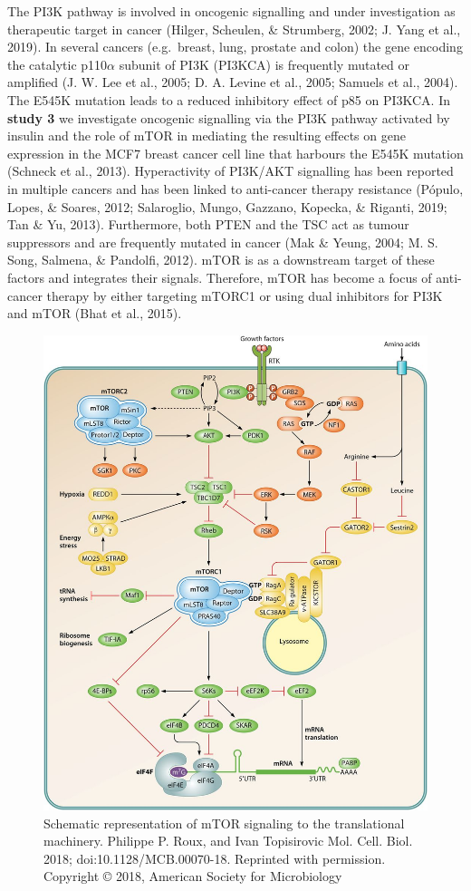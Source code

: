 \documentclass[12pt,openany]{book}
\begin{document}
The PI3K pathway is involved in oncogenic signalling and under
investigation as therapeutic target in cancer (Hilger, Scheulen, \&
Strumberg, 2002; J. Yang et al., 2019). In several cancers (e.g.~breast,
lung, prostate and colon) the gene encoding the catalytic p110\(\alpha\)
subunit of PI3K (PI3KCA) is frequently mutated or amplified (J. W. Lee
et al., 2005; D. A. Levine et al., 2005; Samuels et al., 2004). The
E545K mutation leads to a reduced inhibitory effect of p85 on PI3KCA. In
\textbf{study 3} we investigate oncogenic signalling via the PI3K
pathway activated by insulin and the role of mTOR in mediating the
resulting effects on gene expression in the MCF7 breast cancer cell line
that harbours the E545K mutation (Schneck et al., 2013). Hyperactivity
of PI3K/AKT signalling has been reported in multiple cancers and has
been linked to anti-cancer therapy resistance (Pópulo, Lopes, \& Soares,
2012; Salaroglio, Mungo, Gazzano, Kopecka, \& Riganti, 2019; Tan \& Yu,
2013). Furthermore, both PTEN and the TSC act as tumour suppressors and
are frequently mutated in cancer (Mak \& Yeung, 2004; M. S. Song,
Salmena, \& Pandolfi, 2012). mTOR is as a downstream target of these
factors and integrates their signals. Therefore, mTOR has become a focus
of anti-cancer therapy by either targeting mTORC1 or using dual
inhibitors for PI3K and mTOR (Bhat et al., 2015). \clearpage

\begin{figure}[ht]
 \centering
  \includegraphics{./figures/mTORsignal.jpg}
  \caption{Schematic representation of mTOR signaling to the translational machinery. Philippe P. Roux, and Ivan Topisirovic Mol. Cell. Biol. 2018; doi:10.1128/MCB.00070-18. Reprinted with permission. Copyright © 2018, American Society for Microbiology
 \label{fig:mtorsignal}}
\end{figure}
\end{document}
